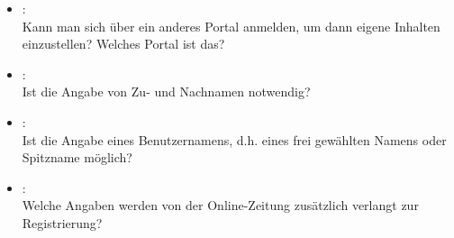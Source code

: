 \begin{itemize}
\item
{}\grqq: \\
Kann man sich über ein anderes Portal anmelden, um dann eigene Inhalten einzustellen? Welches Portal ist das?

\item{}\grqq: \\
Ist die Angabe von Zu- und Nachnamen notwendig?

\item{}\grqq:\\
Ist die Angabe eines Benutzernamens, d.h. eines frei gewählten Namens oder Spitzname möglich?

\item{}\grqq:\\
 Welche Angaben werden von der Online-Zeitung zusätzlich verlangt zur Registrierung?

\end{itemize}



